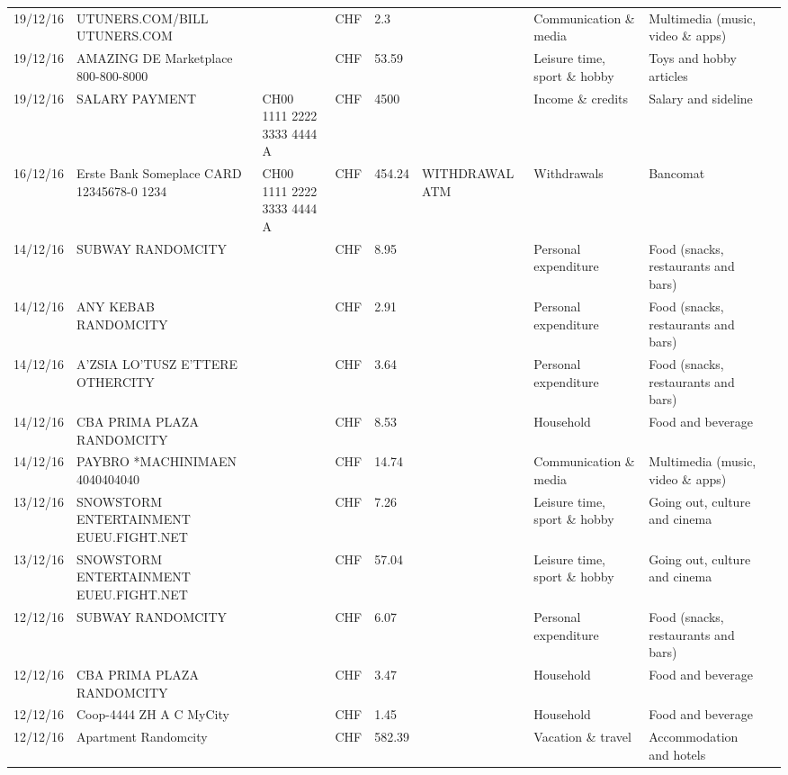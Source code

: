 \begin{landscape}
\begin{tiny}
\begin{longtable}{lp{4cm}llllp{3cm}ll}
		    19/12/16 & UTUNERS.COM/BILL          UTUNERS.COM &       & CHF   & 2.3   &       & Communication \& media & Multimedia (music, video \& apps) \\
		    19/12/16 & AMAZING DE Marketplace    800-800-8000 &       & CHF   & 53.59 &       & Leisure time, sport \& hobby & Toys and hobby articles \\
		    19/12/16 & SALARY PAYMENT & CH00 1111 2222 3333 4444 A & CHF   & 4500  &       & Income \& credits & Salary and sideline \\
		    16/12/16 & Erste Bank Someplace CARD 12345678-0 1234 & CH00 1111 2222 3333 4444 A & CHF   & 454.24 & WITHDRAWAL ATM & Withdrawals & Bancomat \\
		    14/12/16 & SUBWAY                   RANDOMCITY &       & CHF   & 8.95  &       & Personal expenditure & Food (snacks, restaurants and bars) \\
		    14/12/16 & ANY KEBAB            RANDOMCITY &       & CHF   & 2.91  &       & Personal expenditure & Food (snacks, restaurants and bars) \\
		    14/12/16 & A'ZSIA LO'TUSZ E'TTERE   OTHERCITY &       & CHF   & 3.64  &       & Personal expenditure & Food (snacks, restaurants and bars) \\
		    14/12/16 & CBA PRIMA PLAZA        RANDOMCITY &       & CHF   & 8.53  &       & Household & Food and beverage \\
		    14/12/16 & PAYBRO *MACHINIMAEN      4040404040 &       & CHF   & 14.74 &       & Communication \& media & Multimedia (music, video \& apps) \\
		    13/12/16 & SNOWSTORM ENTERTAINMENT EUEU.FIGHT.NET &       & CHF   & 7.26  &       & Leisure time, sport \& hobby & Going out, culture and cinema \\
		    13/12/16 & SNOWSTORM ENTERTAINMENT EUEU.FIGHT.NET &       & CHF   & 57.04 &       & Leisure time, sport \& hobby & Going out, culture and cinema \\
		    12/12/16 & SUBWAY                   RANDOMCITY &       & CHF   & 6.07  &       & Personal expenditure & Food (snacks, restaurants and bars) \\
		    12/12/16 & CBA PRIMA PLAZA        RANDOMCITY &       & CHF   & 3.47  &       & Household & Food and beverage \\
		    12/12/16 & Coop-4444 ZH A C   MyCity &       & CHF   & 1.45  &       & Household & Food and beverage \\
		    12/12/16 & Apartment               Randomcity &       & CHF   & 582.39 &       & Vacation \& travel & Accommodation and hotels \\

\end{longtable}
\end{tiny}
\end{landscape}
